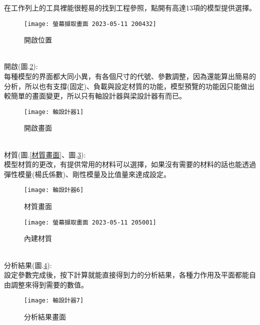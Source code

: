 在工作列上的工具裡能很輕易的找到工程參照，點開有高達13項的模型提供選擇。\\
\begin{figure}[hbt!]
\begin{center}
\texttt{[image: 螢幕擷取畫面 2023-05-11 200432]}
\caption{\Large 開啟位置}\label{開啟位置}
\end{center}
\end{figure}
\\
開啟(圖.\ref{開啟畫面}):\\

每種模型的界面都大同小異，有各個尺寸的代號、參數調整，因為還能算出簡易的分析，所以也有支撐(固定)、負載與設定材質的功能，模型預覽的功能因只能做出較簡單的畫面變更，所以只有軸設計器與梁設計器有而已。\\
\begin{figure}[hbt!]
\begin{center}
\texttt{[image: 軸設計器1]}
\caption{\Large 開啟畫面}\label{開啟畫面}
\end{center}
\end{figure}
\\
材質(圖.\ref{材質畫面}、圖.\ref{內建材質}):\\

模型材質的更改，有提供常用的材料可以選擇，如果沒有需要的材料的話也能透過彈性模量(楊氏係數)、剛性模量及比值量來達成設定。\\
\begin{figure}[hbt!]
\begin{center}
\texttt{[image: 軸設計器6]}
\caption{\Large 材質畫面}\label{材質畫面}
\texttt{[image: 螢幕擷取畫面 2023-05-11 205001]}
\caption{\Large 內建材質}\label{內建材質}
\end{center}
\end{figure}
\\

分析結果(圖.\ref{分析結果畫面}):\\

設定參數完成後，按下計算就能直接得到力的分析結果，各種力作用及平面都能自由調整來得到需要的數值。\\
\begin{figure}[hbt!]
\begin{center}
\texttt{[image: 軸設計器7]}
\caption{\Large 分析結果畫面}\label{分析結果畫面}
\end{center}
\end{figure}
\\

